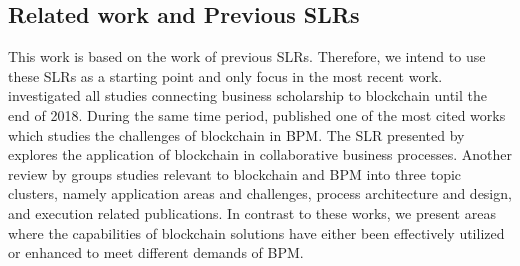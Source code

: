 

\subsection{Related work and Previous SLRs}
This work is based on the work of previous SLRs. Therefore, we intend to use these SLRs as a starting point and only focus in the most recent work. \citeauthor{frizzo-barker_blockchain_2020} \cite{frizzo-barker_blockchain_2020} investigated all studies connecting business scholarship to blockchain until the end of 2018. During the same time period, \citeauthor{mendling_blockchains_2018} \cite{mendling_blockchains_2018} published one of the most cited works which studies the challenges of blockchain in BPM. The SLR presented by \citeauthor{garcia-garcia_using_2020} \cite{garcia-garcia_using_2020} explores the application of blockchain in collaborative business processes. Another review by \citeauthor{lauster} \cite{lauster} groups studies relevant to blockchain and BPM into three topic clusters, namely application areas and challenges, process architecture and design, and execution related publications. In contrast to these works, we present areas where the capabilities of blockchain solutions have either been effectively utilized or enhanced to meet different demands of BPM.